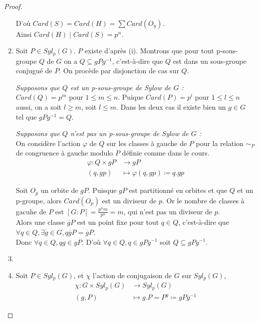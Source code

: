 \documentclass[french]{article}
\theoremstyle{definition}
\theoremstyle{plain}
\theoremstyle{plain}
\theoremstyle{plain}
\theoremstyle{plain}
\theoremstyle{plain}
\begin{document}
\begin{proof}
\begin{enumerate}[label={\upshape(\roman*)}]
D'où \( Card(S) = Card(H) = \sum Card(O_{y}) \). \\
Ainsi \( Card(H) \mid Card(S) = p^{n} \).

\item Soit \( P \in Syl_{p}({G}) \). \( P \) existe d'après (i). Montrons que pour tout p-sous-groupe \( Q \) de \( G \) on a \( Q \subseteq gPg^{-1} \), c'est-à-dire que \( Q \) est dans un sous-groupe conjugué de \( P \). On procède par disjonction de cas sur \( Q \).
	\par \textit{Supposons que \( Q \) est un p-sous-groupe de Sylow de \( G \) :}\\
	\( Card(Q) = p^{m}\) pour \( 1 \le m \le n \). Puique \( Card(P) = p^{l}\) pour 
	\( 1 \le l \le n \) aussi, on a soit \( l \ge m \), soit \( l \le m \). Dans les 
	deux cas il existe bien un \( g \in G \) tel que \( gPg^{-1} = Q \).
	
	\par \textit{Supposons que \( Q \) n'est pas un p-sous-groupe de Sylow de \( G \) :}\\ On considère l'action \( \varphi \) de \( Q \) sur les classes à gauche de \( P \) pour la relation \( \sim_{P} \) de congruence à gauche modulo \( P \) définie comme dans le cours. 
\begin{align*}
	\varphi : Q \times gP &\to gP \\
	(q,gp) &\mapsto \varphi(q,gp) \coloneq q.gp
\end{align*}

Soit \( O_{p} \) un orbite de \( gP \). Puisque \( gP \) est partitionné en orbites et que \( Q \) et un p-groupe, alors \( Card(O_{p}) \) est un diviseur de \( p \). Or le nombre de classes à gacuhe de \( P \) est \([G : P] = \frac{p^{n}m}{p^{n}} = m  \), qui n'est pas un diviseur de \( p \). \\
Alors une classe \( \overline{g}P \) est un point fixe pour tout \( q \in Q \), c'est-à-dire que \( \forall q \in Q, \exists \overline{g} \in G, q\overline{g}P = \overline{g}P \). \\
Donc \( \forall q \in Q, qg \in gP \). D'où \( \forall q \in Q, q \in gPg^{-1} \) soit \( Q \subseteq gPg^{-1} \).

\item

\item Soit \( P \in Syl_{p}(G) \), et \( \chi \) l'action de conjugaison de \( G \) sur \( Syl_{p}(G) \),
\begin{align*}
	\chi : G \times Syl_{p}(G) &\to Syl_{p}(G) \\
	(g,P) &\mapsto g.P = P^{g} \coloneq gPg^{-1}
\end{align*}


\end{enumerate}
\end{proof}
\end{document}
